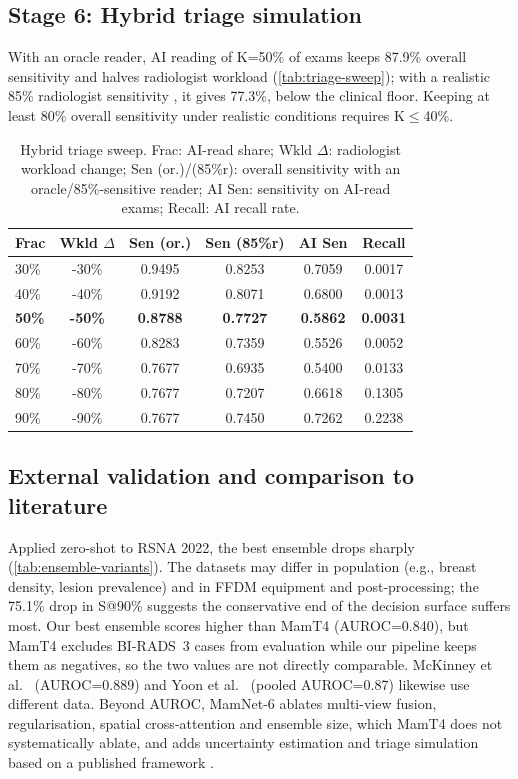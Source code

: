 \documentclass[conference]{IEEEtran}
\newcommand{\rsna}{RSNA 2022}
\newcommand{\mamnet}{MamNet-6}
\begin{document}
\subsection{Stage 6: Hybrid triage simulation}

With an oracle reader, AI reading of K=50\% of exams keeps 87.9\% overall sensitivity and halves radiologist workload (\autoref{tab:triage-sweep}); with a realistic 85\% radiologist sensitivity \cite{17}, it gives 77.3\%, below the clinical floor. Keeping at least 80\% overall sensitivity under realistic conditions requires K$\leq$40\%.

\begin{table}[!t]
\centering
\caption{Hybrid triage sweep. Frac: AI-read share; Wkld $\Delta$: radiologist workload change; Sen (or.)/(85\%r): overall sensitivity with an oracle/85\%-sensitive reader; AI Sen: sensitivity on AI-read exams; Recall: AI recall rate.}
\label{tab:triage-sweep}
{\scriptsize\setlength{\tabcolsep}{2pt}%
\begin{tabular}{|l|c|c|c|c|c|}
\hline
\textbf{Frac} & \textbf{Wkld $\Delta$} & \textbf{Sen (or.)} & \textbf{Sen (85\%r)} & \textbf{AI Sen} & \textbf{Recall} \\
\hline
30\% & -30\% & 0.9495 & 0.8253 & 0.7059 & 0.0017 \\
\hline
40\% & -40\% & 0.9192 & 0.8071 & 0.6800 & 0.0013 \\
\hline
\textbf{50\%} & \textbf{-50\%} & \textbf{0.8788} & \textbf{0.7727} & \textbf{0.5862} & \textbf{0.0031} \\
\hline
60\% & -60\% & 0.8283 & 0.7359 & 0.5526 & 0.0052 \\
\hline
70\% & -70\% & 0.7677 & 0.6935 & 0.5400 & 0.0133 \\
\hline
80\% & -80\% & 0.7677 & 0.7207 & 0.6618 & 0.1305 \\
\hline
90\% & -90\% & 0.7677 & 0.7450 & 0.7262 & 0.2238 \\
\hline
\end{tabular}}
\end{table}

\subsection{External validation and comparison to literature}

Applied zero-shot to \rsna{}, the best ensemble drops sharply (\autoref{tab:ensemble-variants}). The datasets may differ in population (e.g., breast density, lesion prevalence) \cite{1,11} and in FFDM equipment and post-processing; the 75.1\% drop in S@90\% suggests the conservative end of the decision surface suffers most. Our best ensemble scores higher than MamT4 \cite{18} (AUROC=0.840), but MamT4 excludes BI-RADS~3 cases from evaluation while our pipeline keeps them as negatives, so the two values are not directly comparable. McKinney et al.\ \cite{11} (AUROC=0.889) and Yoon et al.\ \cite{4} (pooled AUROC=0.87) likewise use different data. Beyond AUROC, \mamnet{} ablates multi-view fusion, regularisation, spatial cross-attention and ensemble size, which MamT4 does not systematically ablate, and adds uncertainty estimation and triage simulation based on a published framework \cite{12}.
\end{document}
